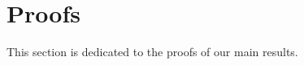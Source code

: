 \documentclass[a4paper, 11pt]{article}
\theoremstyle{definition}
\begin{document}
{













\section{Proofs}{\label{s: proof main}}

This section is dedicated to the proofs of our main results.



}
\end{document}
